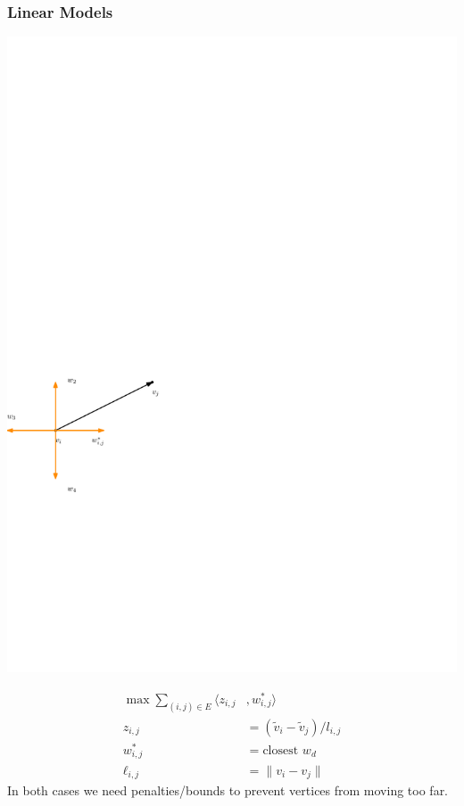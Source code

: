 \documentclass[12pt,t,xcolor=dvipsnames]{beamer}
\begin{document}
\begin{frame}
  \frametitle{Linear Models}
  \begin{minipage}[l]{0.45\textwidth}
    \includegraphics[width=\columnwidth]{snapping2.pdf}
    \end{minipage}
    \begin{minipage}[r]{0.48\textwidth}
    \begin{align*}
       \max \sum_{(i,j) \in E} \langle z_{i,j} &, w^*_{i,j} \rangle\\
      z_{i,j} & = (\tilde{v}_{i} - \tilde{v}_{j})/l_{i,j}\\
       w^*_{i,j}&= \text{closest $w_d$}\\
       \ell_{i,j} &= \| v_i - v_j\|
    \end{align*}
    In both cases we need penalties/bounds to prevent vertices from
    moving too far.
  \end{minipage}
\end{frame}
\end{document}
